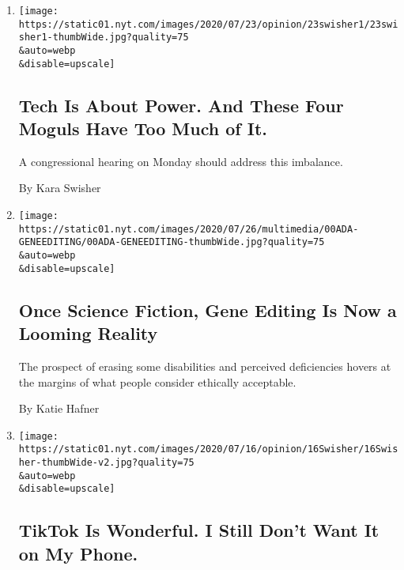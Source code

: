 \begin{enumerate}
\def\labelenumi{\arabic{enumi}.}
\item
  \href{/2020/07/23/opinion/tech-moguls-congressional-hearing.html}{}

  \texttt{[image: https://static01.nyt.com/images/2020/07/23/opinion/23swisher1/23swisher1-thumbWide.jpg?quality=75\\\&auto=webp\\\&disable=upscale]}

  \hypertarget{tech-is-about-power-and-these-four-moguls-have-too-much-of-it}{%
  \subsection{Tech Is About Power. And These Four Moguls Have Too Much
  of
  It.}\label{tech-is-about-power-and-these-four-moguls-have-too-much-of-it}}

  A congressional hearing on Monday should address this imbalance.

  By Kara Swisher
\item
  \href{/2020/07/22/style/crispr-gene-editing-ethics.html}{}

  \texttt{[image: https://static01.nyt.com/images/2020/07/26/multimedia/00ADA-GENEEDITING/00ADA-GENEEDITING-thumbWide.jpg?quality=75\\\&auto=webp\\\&disable=upscale]}

  \hypertarget{once-science-fiction-gene-editing-is-now-a-looming-reality}{%
  \subsection{Once Science Fiction, Gene Editing Is Now a Looming
  Reality}\label{once-science-fiction-gene-editing-is-now-a-looming-reality}}

  The prospect of erasing some disabilities and perceived deficiencies
  hovers at the margins of what people consider ethically acceptable.

  By Katie Hafner
\item
  \href{/2020/07/17/opinion/tiktok-ban-china.html}{}

  \texttt{[image: https://static01.nyt.com/images/2020/07/16/opinion/16Swisher/16Swisher-thumbWide-v2.jpg?quality=75\\\&auto=webp\\\&disable=upscale]}

  \hypertarget{tiktok-is-wonderful-i-still-dont-want-it-on-my-phone}{%
  \subsection{TikTok Is Wonderful. I Still Don't Want It on My
  Phone.}\label{tiktok-is-wonderful-i-still-dont-want-it-on-my-phone}}


\end{enumerate}

